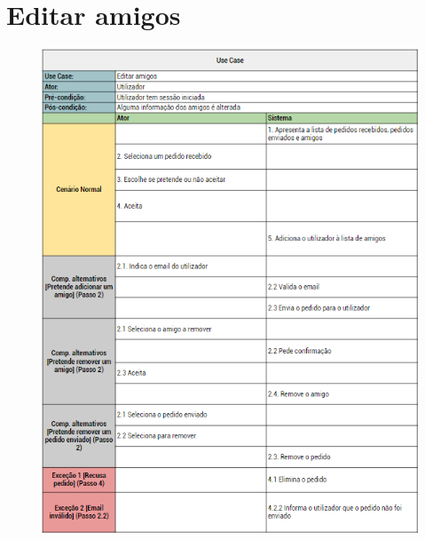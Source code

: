 \documentclass[a4paper]{report}
\begin{document}
    \section{Editar amigos}
        \begin{figure}[H]
        \centering
            \includegraphics[width=\textwidth]{images/usecases/editar_amigos.png}
        \end{figure}
\end{document}
